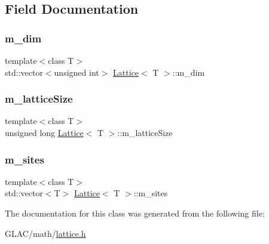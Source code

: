 \subsection{Field Documentation}
\mbox{\label{class_lattice_a6adf73dcd2ef1663d7d38b192f7fd91e}} 
\subsubsection{\texorpdfstring{m\_dim}{m\_dim}}
{\footnotesize\ttfamily template$<$class T$>$ \\
std\+::vector$<$unsigned int$>$ \mbox{\hyperlink{class_lattice}{Lattice}}$<$ T $>$\+::m\+\_\+dim}

\mbox{\label{class_lattice_a933045fb4a76f62d29472e6061ed8a34}} 
\subsubsection{\texorpdfstring{m\_latticeSize}{m\_latticeSize}}
{\footnotesize\ttfamily template$<$class T$>$ \\
unsigned long \mbox{\hyperlink{class_lattice}{Lattice}}$<$ T $>$\+::m\+\_\+lattice\+Size}

\mbox{\label{class_lattice_a605a93a5b2a973811f7cff44a8ab84f7}} 
\subsubsection{\texorpdfstring{m\_sites}{m\_sites}}
{\footnotesize\ttfamily template$<$class T$>$ \\
std\+::vector$<$T$>$ \mbox{\hyperlink{class_lattice}{Lattice}}$<$ T $>$\+::m\+\_\+sites}



The documentation for this class was generated from the following file\+:\begin{DoxyCompactItemize}
\item 
G\+L\+A\+C/math/\mbox{\hyperlink{lattice_8h}{lattice.\+h}}\end{DoxyCompactItemize}
